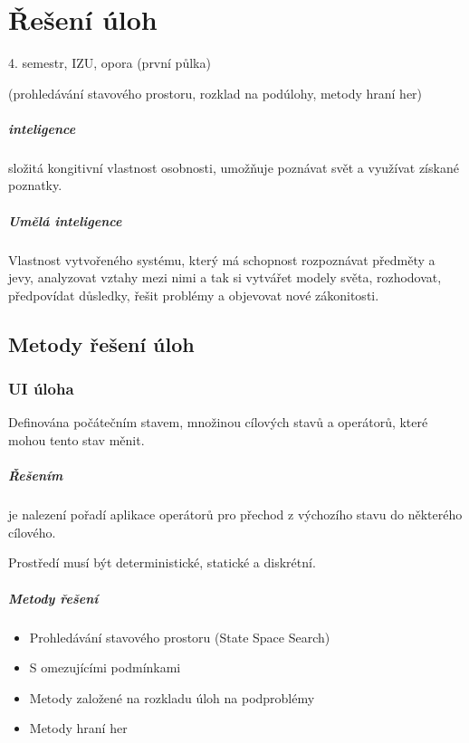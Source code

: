 \documentclass[a4wide]{report}
\begin{document}
\chapter{Řešení úloh} \label{cha:24}

4. semestr, IZU, opora (první půlka)

(prohledávání stavového prostoru, rozklad na podúlohy, metody hraní her)

\paragraph{inteligence} složitá kongitivní vlastnost osobnosti, umožňuje poznávat svět a využívat získané poznatky.

\paragraph{Umělá inteligence}

Vlastnost vytvořeného systému, který má schopnost rozpoznávat předměty a jevy, analyzovat vztahy mezi nimi a tak si vytvářet modely světa, rozhodovat, předpovídat důsledky, řešit problémy a objevovat nové zákonitosti.

\section{Metody řešení úloh}

\subsection{UI úloha}
Definována počátečním stavem, množinou cílových stavů a operátorů, které mohou tento stav měnit.
\paragraph{Řešením} je nalezení pořadí aplikace operátorů pro přechod z výchozího stavu do některého cílového.

Prostředí musí být deterministické, statické a diskrétní.

\paragraph{Metody řešení}
\begin{itemize}
	\item Prohledávání stavového prostoru (State Space Search)
	\item S omezujícími podmínkami
	\item Metody založené na rozkladu úloh na podproblémy
	\item Metody hraní her
\end{itemize}
\end{document}
